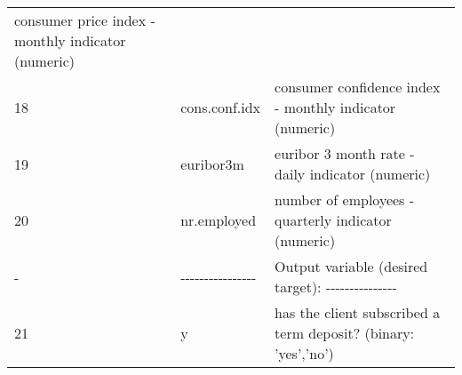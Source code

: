 \documentclass[11pt]{article}
\begin{document}
\begin{longtable}[]{@{}lll@{}}
\begin{minipage}[t]{0.78\columnwidth}
consumer price index - monthly indicator (numeric)\strut
\end{minipage}\tabularnewline
\begin{minipage}[t]{0.01\columnwidth}\raggedright\strut
18\strut
\end{minipage} & \begin{minipage}[t]{0.12\columnwidth}\raggedright\strut
cons.conf.idx\strut
\end{minipage} & \begin{minipage}[t]{0.78\columnwidth}\raggedright\strut
consumer confidence index - monthly indicator (numeric)\strut
\end{minipage}\tabularnewline
\begin{minipage}[t]{0.01\columnwidth}\raggedright\strut
19\strut
\end{minipage} & \begin{minipage}[t]{0.12\columnwidth}\raggedright\strut
euribor3m\strut
\end{minipage} & \begin{minipage}[t]{0.78\columnwidth}\raggedright\strut
euribor 3 month rate - daily indicator (numeric)\strut
\end{minipage}\tabularnewline
\begin{minipage}[t]{0.01\columnwidth}\raggedright\strut
20\strut
\end{minipage} & \begin{minipage}[t]{0.12\columnwidth}\raggedright\strut
nr.employed\strut
\end{minipage} & \begin{minipage}[t]{0.78\columnwidth}\raggedright\strut
number of employees - quarterly indicator (numeric)\strut
\end{minipage}\tabularnewline
\begin{minipage}[t]{0.01\columnwidth}\raggedright\strut
-\strut
\end{minipage} & \begin{minipage}[t]{0.12\columnwidth}\raggedright\strut
-\/-\/-\/-\/-\/-\/-\/-\/-\/-\/-\/-\/-\/-\/-\/-\strut
\end{minipage} & \begin{minipage}[t]{0.78\columnwidth}\raggedright\strut
Output variable (desired target):
-\/-\/-\/-\/-\/-\/-\/-\/-\/-\/-\/-\/-\/-\/-\strut
\end{minipage}\tabularnewline
\begin{minipage}[t]{0.01\columnwidth}\raggedright\strut
21\strut
\end{minipage} & \begin{minipage}[t]{0.12\columnwidth}\raggedright\strut
y\strut
\end{minipage} & \begin{minipage}[t]{0.78\columnwidth}\raggedright\strut
has the client subscribed a term deposit? (binary: 'yes','no')\strut
\end{minipage}\tabularnewline
\bottomrule
\end{longtable}
\end{document}
